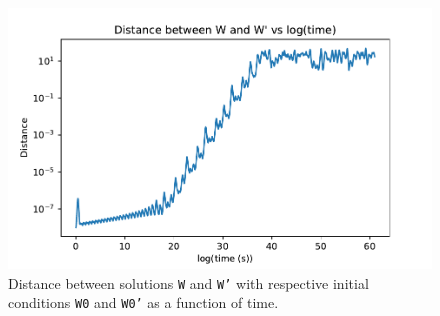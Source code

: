 \documentclass[a4paper,11pt]{article}
\theoremstyle{plain}
\theoremstyle{definition}
\theoremstyle{remark}
\begin{document}
\begin{figure}[H]
    \centering
    \includegraphics[width=\linewidth]{../plots/a3q2_dist_vs_t.pdf}
    \caption{Distance between solutions \texttt{W} and \texttt{W'}
    with respective initial conditions \texttt{W0} and \texttt{W0'}
    as a function of time.}
    \label{q2:3}
\end{figure}
\end{document}
